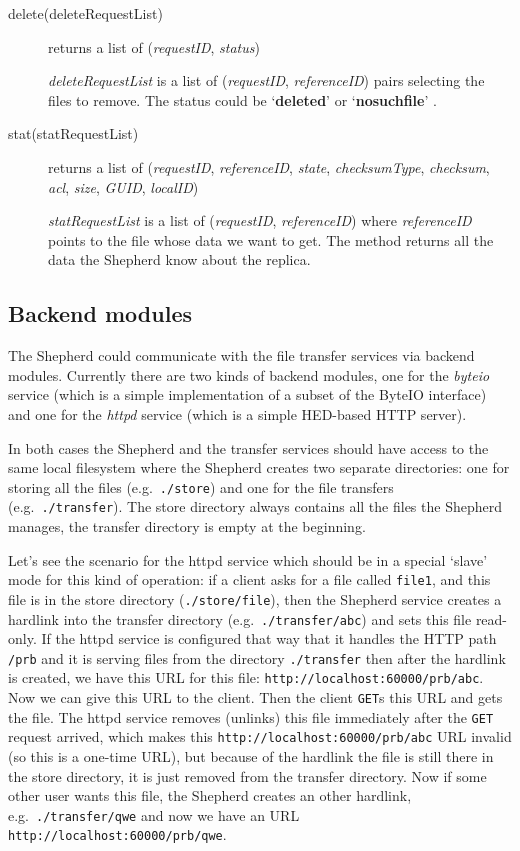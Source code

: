 \documentclass{book}
\begin{document}
\begin{description}
    \item[delete(deleteRequestList)] returns a list of (\emph{requestID}, \emph{status})
    
    \emph{deleteRequestList} is a list of (\emph{requestID}, \emph{referenceID}) pairs selecting the files to remove. The status could be `\textbf{deleted}' or `\textbf{nosuchfile}'
    .
    \item[stat(statRequestList)] returns a list of (\emph{requestID}, \emph{referenceID}, \emph{state}, \emph{checksumType}, \emph{checksum}, \emph{acl}, \emph{size}, \emph{GUID}, \emph{localID})
    
    \emph{statRequestList} is a list of (\emph{requestID}, \emph{referenceID}) where \emph{referenceID} points to the file whose data we want to get. The method returns all the data the Shepherd know about the replica.
     
\end{description}


\subsection{Backend modules} %
\label{sub:backend_modules}

The Shepherd could communicate with the file transfer services via backend modules. Currently there are two kinds of backend modules, one for the \emph{byteio} service (which is a simple implementation of a subset of the ByteIO interface) and one for the \emph{httpd} service (which is a simple HED-based HTTP server).

In both cases the Shepherd and the transfer services should have access to the same local filesystem where the Shepherd creates two separate directories: one for storing all the files (e.g.~\verb!./store!) and one for the file transfers (e.g.~\verb!./transfer!). The store directory always contains all the files the Shepherd manages, the transfer directory is empty at the beginning.

Let's see the scenario for the httpd service which should be in a special `slave' mode for this kind of operation: if a client asks for a file called \verb!file1!, and this file is in the store directory (\verb!./store/file!), then the Shepherd service creates a hardlink into the transfer directory (e.g.~\verb!./transfer/abc!) and sets this file read-only. If the httpd service is configured that way that it handles the HTTP path \verb!/prb! and it is serving files from the directory \verb!./transfer! then after the hardlink is created, we have this URL for this file: \verb!http://localhost:60000/prb/abc!. Now we can give this URL to the client. Then the client \verb!GET!s this URL and gets the file. The httpd service removes (unlinks) this file immediately after the \verb!GET! request arrived, which makes this \verb!http://localhost:60000/prb/abc! URL invalid (so this is a one-time URL), but because of the hardlink the file is still there in the store directory, it is just removed from the transfer directory. Now if some other user wants this file, the Shepherd creates an other hardlink, e.g.~\verb!./transfer/qwe! and now we have an URL \verb!http://localhost:60000/prb/qwe!.
\end{document}
